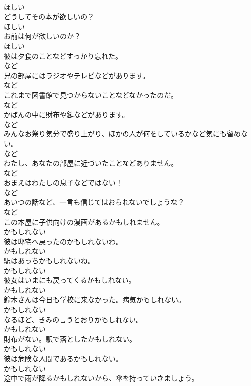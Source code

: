 \documentclass[8pt]{extreport}
\begin{document}
\begin{CJK}{UTF8}{min}
\\	ほしい	
\\	どうしてその本が欲しいの？	
\\	ほしい	
\\	お前は何が欲しいのか？	
\\	ほしい	
\\	彼は夕食のことなどすっかり忘れた。	
\\	など	
\\	兄の部屋にはラジオやテレビなどがあります。	
\\	など	
\\	これまで図書館で見つからないことなどなかったのだ。	
\\	など	
\\	かばんの中に財布や鍵などがあります。	
\\	など	
\\	みんなお祭り気分で盛り上がり、ほかの人が何をしているかなど気にも留めない。	
\\	など	
\\	わたし、あなたの部屋に近づいたことなどありません。	
\\	など	
\\	おまえはわたしの息子などではない！	
\\	など	
\\	あいつの話など、一言も信じてはおられないでしょうな？	
\\	など	
\\	この本屋に子供向けの漫画があるかもしれません。	
\\	かもしれない	
\\	彼は邸宅へ戻ったのかもしれないわ。	
\\	かもしれない	
\\	駅はあっちかもしれないね。	
\\	かもしれない	
\\	彼女はいまにも戻ってくるかもしれない。	
\\	かもしれない	
\\	鈴木さんは今日も学校に来なかった。病気かもしれない。	
\\	かもしれない	
\\	なるほど、きみの言うとおりかもしれない。	
\\	かもしれない	
\\	財布がない。駅で落としたかもしれない。	
\\	かもしれない	
\\	彼は危険な人間であるかもしれない。	
\\	かもしれない	
\\	途中で雨が降るかもしれないから、傘を持っていきましょう。	

\end{CJK}
\end{document}
